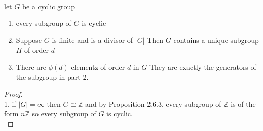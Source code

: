\documentclass{article}
\begin{document}
\begin{proposition}[2.7.4] \leavevmode \\ 
    let $G$ be a cyclic group 
    \begin{enumerate}
        \item every subgroup of $G$ is cyclic 
        \item Suppose $G$ is finite and is a divisor of $|G|$ Then $G$ contains a unique subgroup $H$ of order $d$ 
        \item There are $\phi(d) $ elementz of order $d$ in $G$ They are exactly the generators of the subgroup in part 2.
    \end{enumerate}
    
\end{proposition}
\begin{proof} \leavevmode \\ 
1. if $|G| = \infty$ then $G \cong \mathbb{Z}$ and by Proposition 2.6.3, every subgroup of $\mathbb{Z}$ is of the form $n\mathbb{Z}$ so every subgroup of $G$ is cyclic. \\
\end{proof}
\end{document}

